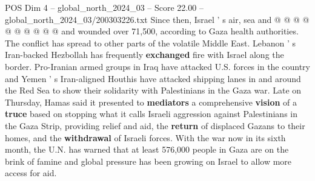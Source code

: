 \begin{textsample}{POS Dim 4 – global\_north\_2024\_03 – Score 22.00 – global\_north\_2024\_03/200303226.txt}
Since then, Israel ' s air, sea and @ @ @ @ @ @ @ @ @ @ and wounded over 71,500, according to Gaza health authorities.
The conflict has spread to other parts of the volatile Middle East.
Lebanon ' s Iran-backed Hezbollah has frequently \textbf{exchanged} fire with Israel along the border.
Pro-Iranian armed groups in Iraq have attacked U.S. forces in the country and Yemen ' s Iran-aligned Houthis have attacked shipping lanes in and around the Red Sea to show their solidarity with Palestinians in the Gaza war.
Late on Thursday, Hamas said it presented to \textbf{mediators} a comprehensive \textbf{vision} of a \textbf{truce} based on stopping what it calls Israeli aggression against Palestinians in the Gaza Strip, providing relief and aid, the \textbf{return} of displaced Gazans to their homes, and the \textbf{withdrawal} of Israeli forces.
With the war now in its sixth month, the U.N. has warned that at least 576,000 people in Gaza are on the brink of famine and global pressure has been growing on Israel to allow more access for aid.

\end{textsample}
